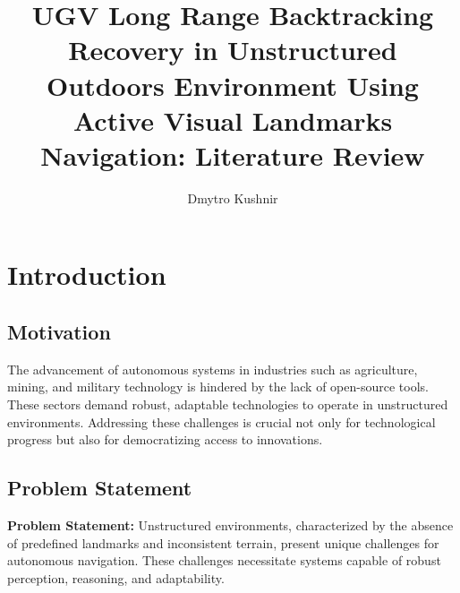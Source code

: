 \documentclass[runningheads]{llncs}
\let\origlncsMaketitle\maketitle
\renewcommand{\maketitle}{%
  \begingroup
    \let\savedaddcontentsline\addcontentsline
    \renewcommand{\addcontentsline}[3]{}
    \origlncsMaketitle
  \endgroup
}
\begin{document}
\sloppy %

%
\title{
  UGV Long Range Backtracking Recovery in Unstructured Outdoors Environment Using Active Visual Landmarks Navigation:
  Literature Review
}

\author{Dmytro Kushnir }
%
%
%
\maketitle              %
%

\tableofcontents


\section{Introduction}

\subsection{Motivation}

The advancement of autonomous systems in industries such as agriculture, mining, and military technology is hindered by the lack of open-source tools. These sectors demand robust, adaptable technologies to operate in unstructured environments. Addressing these challenges is crucial not only for technological progress but also for democratizing access to innovations.


\subsection{Problem Statement}

\textbf{Problem Statement:} Unstructured environments, characterized by the absence of predefined landmarks and inconsistent terrain, present unique challenges for autonomous navigation. These challenges necessitate systems capable of robust perception, reasoning, and adaptability.

\end{document}
